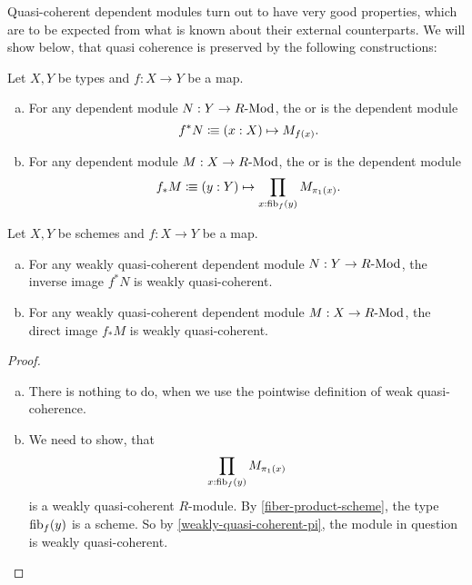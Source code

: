 Quasi-coherent dependent modules turn out to have very good properties,
which are to be expected from what is known about their external counterparts.
We will show below, that quasi coherence is preserved by the following constructions:

\begin{definition}
  \label{pullback-push-forward}
  Let $X,Y$ be types and $f:X\to Y$ be a map.
  \begin{enumerate}[(a)]
  \item {} For any dependent module $N:Y\to R\text{-}\mathrm{Mod}$,
    the  or  is the dependent module
    \[
      f^*N\colonequiv (x:X) \mapsto M_{f(x)}\rlap{.}
    \]
  \item {} For any dependent module $M:X\to R\text{-}\mathrm{Mod}$,
    the  or  is the dependent module
    \[
      f_*M\colonequiv (y:Y) \mapsto \prod_{x:\fib_f(y)}M_{\pi_1(x)}\rlap{.}
    \]
  \end{enumerate}
\end{definition}

\begin{theorem}%
  \label{pullback-push-forward-qcoh}
  Let $X,Y$ be schemes and $f:X\to Y$ be a map.
  \begin{enumerate}[(a)]
  \item For any weakly quasi-coherent dependent module $N:Y\to R\text{-}\mathrm{Mod}$,
    the inverse image $f^*N$ is weakly quasi-coherent.
  \item For any weakly quasi-coherent dependent module $M:X\to R\text{-}\mathrm{Mod}$,
    the direct image $f_*M$ is weakly quasi-coherent.
  \end{enumerate}
\end{theorem}

\begin{proof}
  \begin{enumerate}[(a)]
  \item There is nothing to do, when we use the pointwise definition of weak quasi-coherence. 
  \item We need to show, that
    \[
      \prod_{x:\mathrm{fib}_f(y)}M_{\pi_1(x)}
    \]
    is a weakly quasi-coherent $R$-module.
    By \cref{fiber-product-scheme},
    the type $\mathrm{fib}_f(y)$ is a scheme.
    So by \cref{weakly-quasi-coherent-pi},
    the module in question is weakly quasi-coherent.
  \end{enumerate}
\end{proof}

